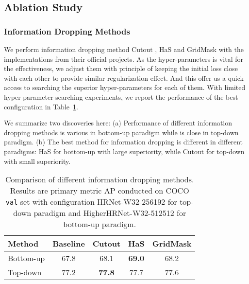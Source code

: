 \documentclass[final]{cvpr}
\begin{document}
\subsection{Ablation Study}
\label{sec:ablation}


\subsubsection{Information Dropping Methods}
We perform information dropping method Cutout \cite{Cutout}, HaS \cite{HaS} and GridMask \cite{GridMask} with the implementations from their official projects. As the hyper-parameters is vital for the effectiveness, we adjust them with principle of keeping the initial loss close with each other to provide similar regularization effect. And this offer us a quick access to searching the superior hyper-parameters for each of them. With limited hyper-parameter searching experiments, we report the performance of the best configuration in Table~\ref{tab:diffid}.

We summarize two discoveries here: (a) Performance of different information dropping methods is various in bottom-up paradigm while is close in top-down paradigm. (b) The best method for information dropping is different in different paradigms: HaS for bottom-up with large superiority, while Cutout for top-down with small superiority.

\begin{table}[h]
\footnotesize
\begin{center}
\begin{tabular}{l|c|c|c|c}

\hline
Method     & Baseline    &Cutout        &HaS            &GridMask        \\
\hline
Bottom-up  & 67.8        &68.1          &\textbf{69.0}  &68.2           \\
Top-down   & 77.2        &\textbf{77.8} &77.7           &77.6           \\
\hline
\end{tabular}
\end{center}
\caption{Comparison of different information dropping methods. Results are primary metric AP conducted on COCO \texttt{val} set with configuration HRNet-W32-256192 for top-down paradigm and HigherHRNet-W32-512512 for bottom-up paradigm.}
\label{tab:diffid}
\end{table}
\vspace{-0.3cm}
\end{document}
